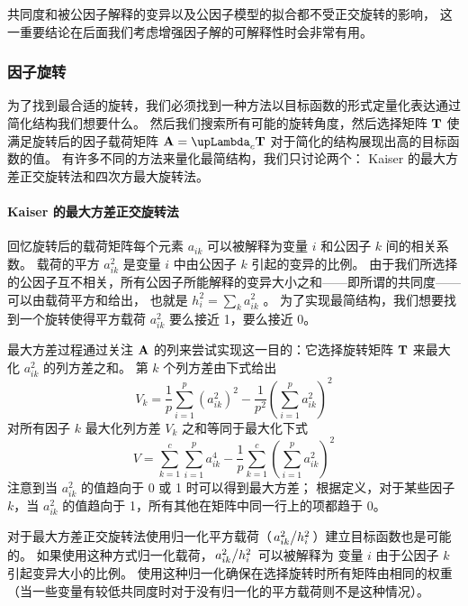 共同度和被公因子解释的变异以及公因子模型的拟合都不受正交旋转的影响，
这一重要结论在后面我们考虑增强因子解的可解释性时会非常有用。

\subsubsection{因子旋转}

为了找到最合适的旋转，我们必须找到一种方法以目标函数的形式定量化表达通过简化结构我们想要什么。
然后我们搜索所有可能的旋转角度，然后选择矩阵 $ \mathbf{T} $ 使满足旋转后的因子载荷矩阵 $ \vA = \vLambda_c\vT $
对于简化的结构展现出高的目标函数的值。
有许多不同的方法来量化最简结构，我们只讨论两个： Kaiser 的最大方差正交旋转法和四次方最大旋转法。

\paragraph{Kaiser 的最大方差正交旋转法}
回忆旋转后的载荷矩阵每个元素 $ a_{ik} $ 可以被解释为变量 $ i $ 和公因子 $ k $ 间的相关系数。
载荷的平方 $ a_{ik}^2 $ 是变量 $ i $ 中由公因子 $ k $ 引起的变异的比例。
由于我们所选择的公因子互不相关，所有公因子所能解释的变异大小之和——即所谓的共同度——可以由载荷平方和给出，
也就是 $ h_i^2 = \sum_k a_{ik}^2 $ 。
为了实现最简结构，我们想要找到一个旋转使得平方载荷 $ a_{ik}^2 $ 要么接近 1，要么接近 0。

最大方差过程通过关注 $ \mathbf{A} $ 的列来尝试实现这一目的：它选择旋转矩阵 $ \mathbf{T} $ 来最大化 $ a_{ik}^2 $ 的列方差之和。
第 $ k $ 个列方差由下式给出
\begin{equation}
    V_k = \frac{1}{p} \sum_{i=1}^{p}\left(a_{ik}^2\right)^2 - \frac{1}{p^2}\left(\sum_{i=1}^{p}a_{ik}^2\right)^2
\end{equation}
对所有因子 $ k $ 最大化列方差 $ V_k $ 之和等同于最大化下式
\begin{equation}
    V = \sum_{k=1}^{c}\sum_{i=1}^{p}a_{ik}^4 - \frac{1}{p}\sum_{k=1}^{c}\left(\sum_{i=1}^{p}a_{ik}^2\right)^2
\end{equation}
注意到当 $ a_{ik}^2 $ 的值趋向于 0 或 1 时可以得到最大方差；
根据定义，对于某些因子 $ k $，当 $ a_{ik}^2 $ 的值趋向于 1，所有其他在矩阵中同一行上的项都趋于 0。 

对于最大方差正交旋转法使用归一化平方载荷（$ \left. {a_{ik}^2} \middle/ {h_i^2} \right. $）建立目标函数也是可能的。
如果使用这种方式归一化载荷，$ \left. {a_{ik}^2} \middle/ {h_i^2} \right. $ 可以被解释为
变量 $ i $ 由于公因子 $ k $ 引起变异大小的比例。
使用这种归一化确保在选择旋转时所有矩阵由相同的权重
（当一些变量有较低共同度时对于没有归一化的平方载荷则不是这种情况）。

